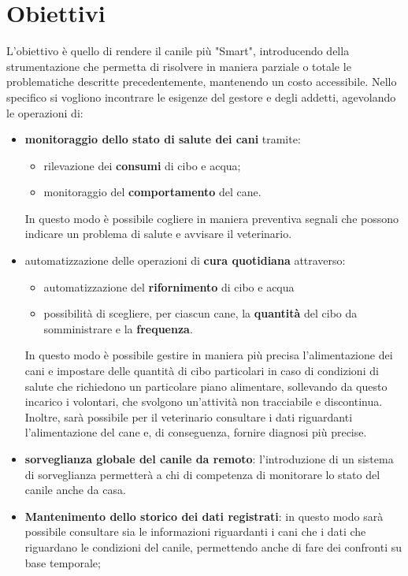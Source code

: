 \section{Obiettivi}
L'obiettivo è quello di rendere il canile più "Smart", introducendo della strumentazione che permetta di risolvere in maniera parziale o totale le problematiche descritte precedentemente, mantenendo un costo accessibile. 
Nello specifico si vogliono incontrare le esigenze del gestore e degli addetti, agevolando le operazioni di:
\begin{itemize}
    \item \textbf{monitoraggio dello stato di salute dei cani} tramite:
    \begin{itemize}
        \item rilevazione dei \textbf{consumi} di cibo e acqua;
        \item monitoraggio del \textbf{comportamento} del cane.
    \end{itemize}
    In questo modo è possibile cogliere in maniera preventiva segnali che possono indicare un problema di salute e avvisare il veterinario. 
    \item automatizzazione delle operazioni di
\textbf{cura quotidiana} attraverso:
    \begin{itemize}
        \item automatizzazione del \textbf{rifornimento} di cibo e acqua
        \item possibilità di scegliere, per ciascun cane, la \textbf{quantità} del cibo da somministrare e la \textbf{frequenza}.
    \end{itemize}
    In questo modo è possibile gestire in maniera più precisa l'alimentazione dei cani e impostare delle quantità di cibo particolari in caso di condizioni di salute che richiedono un particolare piano alimentare, sollevando da questo incarico i volontari, che svolgono un'attività non tracciabile e discontinua. Inoltre, sarà possibile per il veterinario consultare i dati riguardanti l'alimentazione del cane e, di conseguenza, fornire diagnosi più precise. 
    \item \textbf{sorveglianza
globale del canile da remoto}: l'introduzione di un sistema di sorveglianza permetterà a chi di competenza di monitorare lo stato del canile anche da casa.
\item \textbf{Mantenimento dello storico dei dati registrati}: in questo modo sarà possibile consultare sia le informazioni riguardanti i cani che i dati che riguardano le condizioni del canile, permettendo anche di fare dei confronti su base temporale;

\end{itemize}
